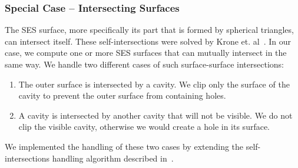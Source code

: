 \subsubsection{Special Case -- Intersecting Surfaces}
\label{sec:intersecting}
The SES surface, more specifically its part that is formed by spherical triangles, can intersect itself.
These self-intersections were solved by Krone et. al~\cite{krone2009interactive}.
In our case, we compute one or more SES surfaces that can mutually intersect in the same way.
We handle two different cases of such surface-surface intersections:
\begin{enumerate}
	\item The outer surface is intersected by a cavity. We clip only the surface of the cavity to prevent the outer surface from containing holes.
	\item A cavity is intersected by another cavity that will not be visible. We do not clip the visible cavity, otherwise we would create a hole in its surface.
\end{enumerate}
We implemented the handling of these two cases by extending the self-intersections handling algorithm described in~\cite{krone2011parallel}.
